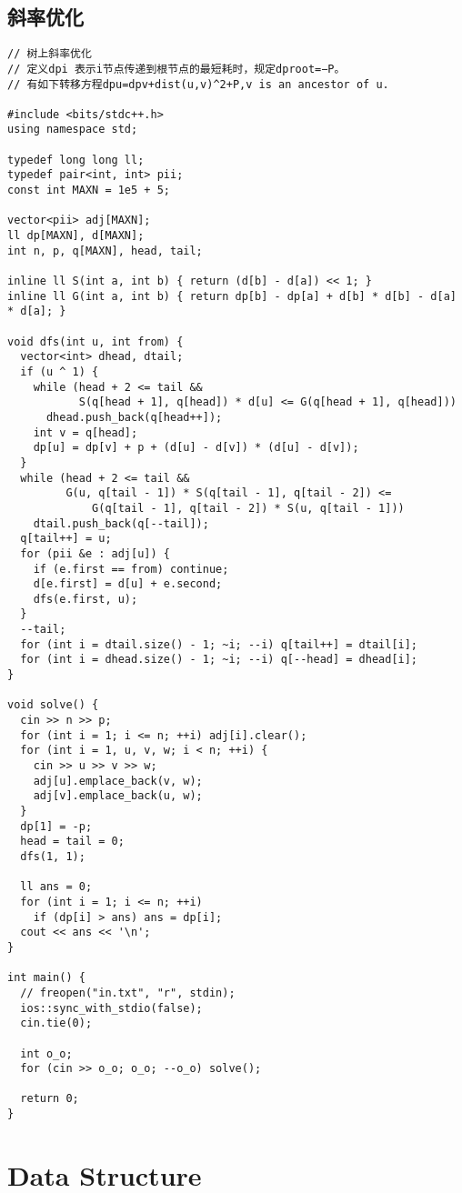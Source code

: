 \documentclass[twoside]{article}
\begin{document}
\subsection{斜率优化}
\begin{lstlisting}
// 树上斜率优化
// 定义dpi 表示i节点传递到根节点的最短耗时，规定dproot=−P。
// 有如下转移方程dpu=dpv+dist(u,v)^2+P,v is an ancestor of u.

#include <bits/stdc++.h>
using namespace std;

typedef long long ll;
typedef pair<int, int> pii;
const int MAXN = 1e5 + 5;

vector<pii> adj[MAXN];
ll dp[MAXN], d[MAXN];
int n, p, q[MAXN], head, tail;

inline ll S(int a, int b) { return (d[b] - d[a]) << 1; }
inline ll G(int a, int b) { return dp[b] - dp[a] + d[b] * d[b] - d[a] * d[a]; }

void dfs(int u, int from) {
  vector<int> dhead, dtail;
  if (u ^ 1) {
    while (head + 2 <= tail &&
           S(q[head + 1], q[head]) * d[u] <= G(q[head + 1], q[head]))
      dhead.push_back(q[head++]);
    int v = q[head];
    dp[u] = dp[v] + p + (d[u] - d[v]) * (d[u] - d[v]);
  }
  while (head + 2 <= tail &&
         G(u, q[tail - 1]) * S(q[tail - 1], q[tail - 2]) <=
             G(q[tail - 1], q[tail - 2]) * S(u, q[tail - 1]))
    dtail.push_back(q[--tail]);
  q[tail++] = u;
  for (pii &e : adj[u]) {
    if (e.first == from) continue;
    d[e.first] = d[u] + e.second;
    dfs(e.first, u);
  }
  --tail;
  for (int i = dtail.size() - 1; ~i; --i) q[tail++] = dtail[i];
  for (int i = dhead.size() - 1; ~i; --i) q[--head] = dhead[i];
}

void solve() {
  cin >> n >> p;
  for (int i = 1; i <= n; ++i) adj[i].clear();
  for (int i = 1, u, v, w; i < n; ++i) {
    cin >> u >> v >> w;
    adj[u].emplace_back(v, w);
    adj[v].emplace_back(u, w);
  }
  dp[1] = -p;
  head = tail = 0;
  dfs(1, 1);

  ll ans = 0;
  for (int i = 1; i <= n; ++i)
    if (dp[i] > ans) ans = dp[i];
  cout << ans << '\n';
}

int main() {
  // freopen("in.txt", "r", stdin);
  ios::sync_with_stdio(false);
  cin.tie(0);

  int o_o;
  for (cin >> o_o; o_o; --o_o) solve();

  return 0;
}

\end{lstlisting}

\section{Data Structure}
\end{document}
